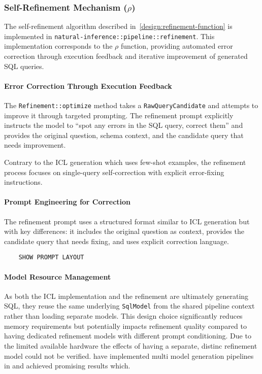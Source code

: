 \subsubsection{Self-Refinement Mechanism ($\rho$)}

The self-refinement algorithm described in~\ref{design:refinement-function}
is implemented in \texttt{natural-inference::pipeline::refinement}.
This implementation corresponds to the $\rho$ function, providing
automated error correction through execution feedback and iterative
improvement of generated SQL queries.

\paragraph{Error Correction Through Execution Feedback}

The \texttt{Refinement::optimize} method takes a \texttt{RawQueryCandidate} and
attempts to improve it through targeted prompting. The refinement prompt
explicitly instructs the model to ``spot any errors in the SQL query, correct
them'' and provides the original question, schema context, and the candidate
query that needs improvement.

Contrary to the ICL generation which uses few-shot examples, the
refinement process focuses on single-query self-correction with explicit
error-fixing instructions.

\paragraph{Prompt Engineering for Correction}

The refinement prompt uses a structured format similar to ICL generation but
with key differences: it includes the original question as context, provides
the candidate query that needs fixing, and uses explicit correction language.

\begin{verbatim}
    SHOW PROMPT LAYOUT
\end{verbatim}

\paragraph{Model Resource Management}

As both the ICL implementation and the refinement are ultimately generating
SQL, they reuse the same underlying \texttt{SqlModel} from the shared pipeline
context rather than loading separate models. This design choice
significantly reduces memory requirements but potentially impacts refinement
quality compared to having dedicated refinement models with different prompt
conditioning. Due to the limited available hardware the effects of having a
separate, distinc refinement model could not be verified. \citeauthor{XiYan}
have implemented multi model generation pipelines in \citeyear{XiYan} and
achieved promising results which.


